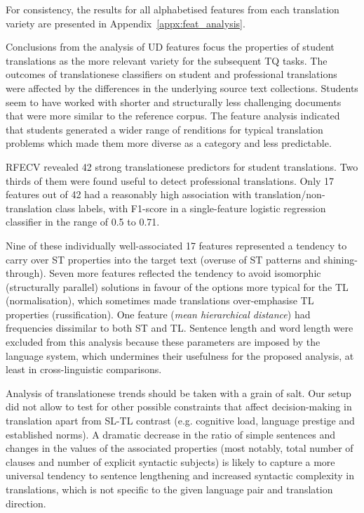 For consistency, the results for all alphabetised features from each translation variety are presented in Appendix~\ref{appx:feat_analysis}.  

Conclusions from the analysis of UD features focus the properties of student translations as the more relevant variety for the subsequent TQ tasks. The outcomes of translationese classifiers on student and professional translations were affected by the differences in the underlying source text collections. Students seem to have worked with shorter and structurally less challenging documents that were more similar to the reference corpus. 
The feature analysis indicated that students generated a wider range of renditions for typical translation problems which made them more diverse as a category and less predictable.

RFECV revealed 42 strong translationese predictors for student translations. Two thirds of them were found useful to detect professional translations. Only 17 features out of 42 had a reasonably high association with translation/non-translation class labels, with F1-score in a single-feature logistic regression classifier in the range of 0.5 to 0.71. 

Nine of these individually well-associated 17 features represented a tendency to carry over ST properties into the target text (overuse of ST patterns and shining-through). Seven more features reflected the tendency to avoid isomorphic (structurally parallel) solutions in favour of the options more typical for the TL (normalisation), which sometimes made translations over-emphasise TL properties (russification). One feature (\textit{mean hierarchical distance}) had frequencies dissimilar to both ST and TL.
Sentence length and word length were excluded from this analysis because these parameters are imposed by the language system, which undermines their usefulness for the proposed analysis, at least in cross-linguistic comparisons.

Analysis of translationese trends should be taken with a grain of salt. Our setup did not allow to test for other possible constraints that affect decision-making in translation apart from SL-TL contrast (e.g. cognitive load, language prestige and established norms). A dramatic decrease in the ratio of simple sentences and changes in the values of the associated properties (most notably, total number of clauses and number of explicit syntactic subjects) is likely to capture a more universal tendency to sentence lengthening and increased syntactic complexity in translations, which is not specific to the given language pair and translation direction. 

